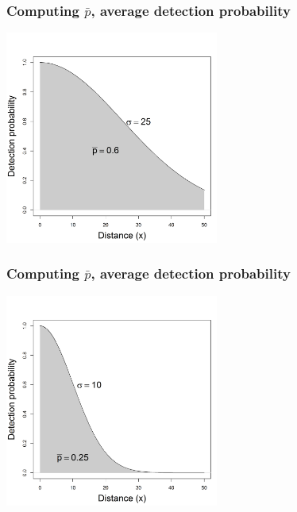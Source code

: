 \documentclass[color=usenames,dvipsnames]{beamer}\usepackage[]{graphicx}\usepackage[]{color}
\begin{document}
\begin{frame}
  \frametitle{Computing $\bar{p}$, average detection probability}
\begin{center}
  \includegraphics[width=7cm]{figs/detfun3}
\end{center}
\end{frame}




\begin{frame}
  \frametitle{Computing $\bar{p}$, average detection probability}
\begin{center}
  \includegraphics[width=7cm]{figs/detfun4}
\end{center}
\end{frame}
\end{document}
